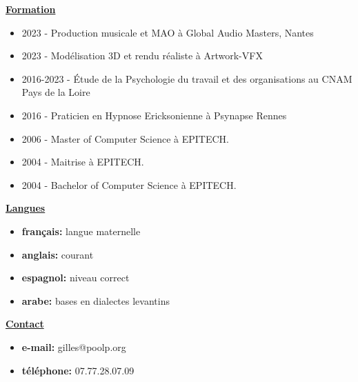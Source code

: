 \documentclass[a4paper,10pt]{letter}
\begin{document}
\underline{\textbf{Formation}}\\
\begin{itemize}
\item 2023 - Production musicale et MAO \`a Global Audio Masters, Nantes
\item 2023 - Mod\'elisation 3D et rendu r\'ealiste \`a Artwork-VFX
\item 2016-2023 - \'Etude de la Psychologie du travail et des organisations au CNAM Pays de la Loire
\item 2016 - Praticien en Hypnose Ericksonienne \`a Psynapse Rennes
\item 2006 - Master of Computer Science \`a {EPITECH.}
\item 2004 - Maitrise \`a {EPITECH.}
\item 2004 - Bachelor of Computer Science \`a {EPITECH.}\\
\end{itemize}

\underline{\textbf{Langues}}\\
\begin{itemize}
\item	\textbf{fran\c cais:}	langue maternelle
\item	\textbf{anglais:}		  courant
\item	\textbf{espagnol:}		niveau correct
\item	\textbf{arabe:}			  bases en dialectes levantins\\
\end{itemize}

\underline{\textbf{Contact}}\\
\begin{itemize}
\item	\textbf{e-mail:}	gilles@poolp.org
\item	\textbf{t\'el\'ephone:}	07.77.28.07.09
\end{itemize}

\pagebreak
\end{document}
